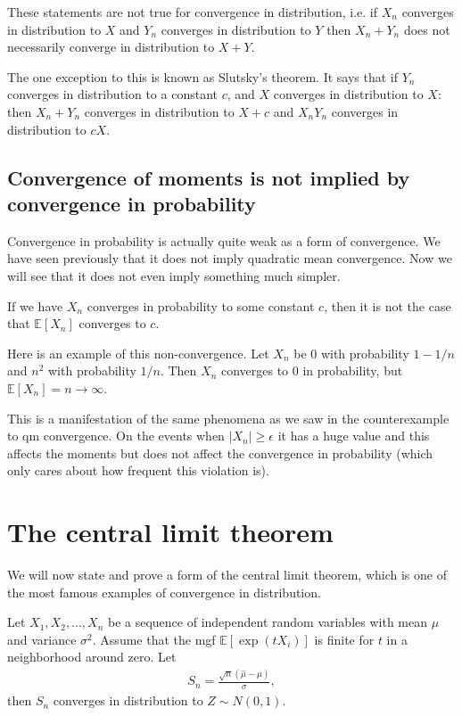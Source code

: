 \documentclass[twoside,12pt]{article}
\begin{document}
These statements are not true for convergence in distribution, i.e. if $X_n$ converges in distribution to $X$ and $Y_n$ converges in distribution to $Y$ then $X_n + Y_n$ does not necessarily converge in distribution to $X+Y$.

The one exception to this is known as Slutsky's theorem. It says that if $Y_n$ converges in distribution to a constant $c$, and $X$ converges in distribution to $X$: then $X_n + Y_n$ converges in distribution to $X + c$ and $X_nY_n$ converges in distribution to $cX$.



\subsection{Convergence of moments is not implied by convergence in probability}
Convergence in probability is actually quite weak as a form of convergence. We have seen previously that it does not imply quadratic mean convergence. Now we will see that it does not even imply something much simpler. 

If we have $X_n$ converges in probability to some constant $c$, then it is not the case that $\mathbb{E}[X_n]$ converges to $c$. 

Here is an example of this non-convergence. Let $X_n$ be 0 with probability $1 - 1/n$ and $n^2$ with probability $1/n$. Then $X_n$ converges to 0 in probability, but $\mathbb{E}[X_n] = n \rightarrow \infty$.

This is a manifestation of the same phenomena as we saw in the counterexample to qm convergence. On the events when $|X_n| \geq \epsilon$ it has a huge value and this affects the moments but does not affect the convergence in probability (which only cares about how frequent this violation is).

\section{The central limit theorem}
We will now state and prove a form of the central limit theorem, which is one of the most famous examples of convergence in distribution.

Let $X_1, X_2,\ldots,X_n$
be a sequence of independent random
variables with mean $\mu$ and variance $\sigma^2$. 
Assume that the mgf $\mathbb{E}[\exp(tX_i)]$ is finite for $t$ in a neighborhood around zero. 
Let 
\begin{align*}
S_n =  \frac{\sqrt{n}(\widehat{\mu} - \mu)}{\sigma},
\end{align*}
then $S_n$ converges in distribution to $Z \sim N(0,1)$.
\end{document}
